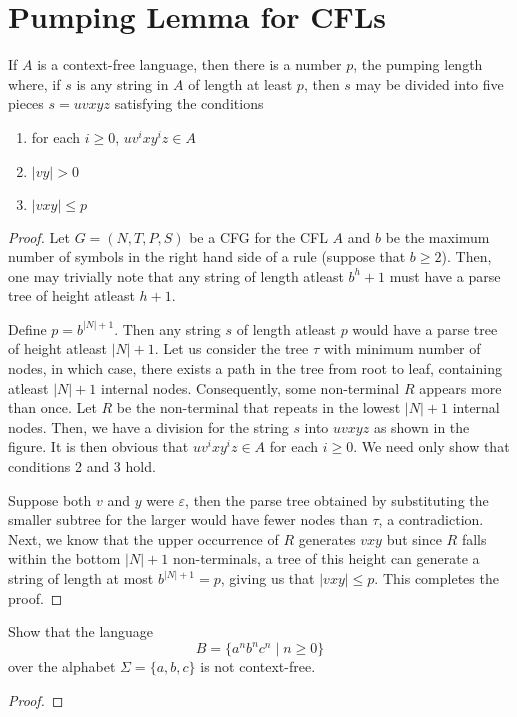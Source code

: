 \section{Pumping Lemma for CFLs}
\begin{theorem}
    If $A$ is a context-free language, then there is a number $p$, the pumping length where, if $s$ is any string in $A$ of length at least $p$, then $s$ may be divided into five pieces $s = uvxyz$ satisfying the conditions 
    \begin{enumerate}
        \item for each $i\ge 0$, $uv^ixy^iz\in A$
        \item $|vy| > 0$ 
        \item $|vxy|\le p$
    \end{enumerate}
\end{theorem}
\begin{proof}
    Let $G = (N, T, P, S)$ be a CFG for the CFL $A$ and $b$ be the maximum number of symbols in the right hand side of a rule (suppose that $b\ge2$). Then, one may trivially note that any string of length atleast $b^h + 1$ must have a parse tree of height atleast $h + 1$.

    Define $p = b^{|N| + 1}$. Then any string $s$ of length atleast $p$ would have a parse tree of height atleast $|N| + 1$. Let us consider the tree $\tau$ with minimum number of nodes, in which case, there exists a path in the tree from root to leaf, containing atleast $|N| + 1$ internal nodes. Consequently, some non-terminal $R$ appears more than once. Let $R$ be the non-terminal that repeats in the lowest $|N| + 1$ internal nodes. Then, we have a division for the string $s$ into $uvxyz$ as shown in the figure. It is then obvious that $uv^ixy^iz\in A$ for each $i\ge 0$. We need only show that conditions 2 and 3 hold.

    Suppose both $v$ and $y$ were $\varepsilon$, then the parse tree obtained by substituting the smaller subtree for the larger would have fewer nodes than $\tau$, a contradiction. Next, we know that the upper occurrence of $R$ generates $vxy$ but since $R$ falls within the bottom $|N| + 1$ non-terminals, a tree of this height can generate a string of length at most $b^{|N| + 1} = p$, giving us that $|vxy|\le p$. This completes the proof.
\end{proof}

\begin{example}
    Show that the language 
    \begin{equation*}
        B = \{a^nb^nc^n\mid n\ge0\}
    \end{equation*}
    over the alphabet $\Sigma = \{a, b, c\}$ is not context-free.
\end{example}
\begin{proof}
    
\end{proof}